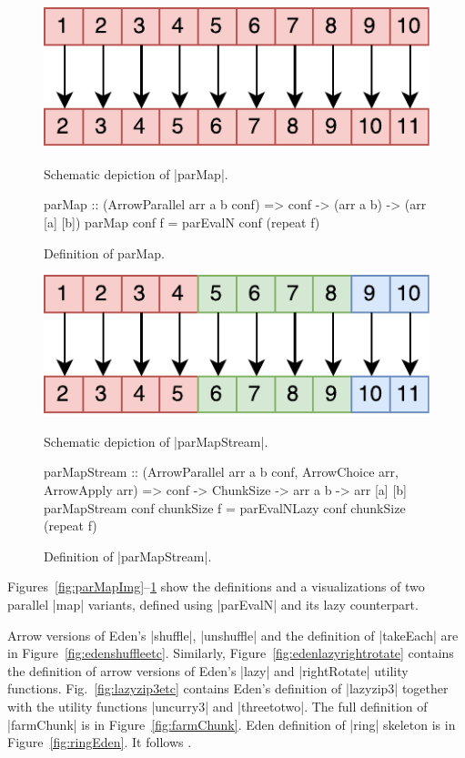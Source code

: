 \begin{figure}[thb]
\includegraphics[scale=0.7]{images/parMap}
\caption{Schematic depiction of |parMap|.}
\label{fig:parMapImg}

\begin{code}
parMap :: (ArrowParallel arr a b conf) => conf -> (arr a b) -> (arr [a] [b])
parMap conf f = parEvalN conf (repeat f)
\end{code}
\caption{Definition of parMap.}
\label{fig:parMap}

\includegraphics[scale=0.7]{images/parMapStream}
\caption{Schematic depiction of |parMapStream|.}
\label{fig:parMapStreamImg}

\begin{code}
parMapStream :: (ArrowParallel arr a b conf, ArrowChoice arr, ArrowApply arr) =>
	conf -> ChunkSize -> arr a b -> arr [a] [b]
parMapStream conf chunkSize f = parEvalNLazy conf chunkSize (repeat f)
\end{code}
\caption{Definition of |parMapStream|.}
\label{fig:parMapStream}
\end{figure}

Figures~\ref{fig:parMapImg}--\ref{fig:parMapStream} show the definitions and a visualizations of two parallel |map| variants, defined using |parEvalN| and its lazy counterpart.

Arrow versions of Eden's |shuffle|, |unshuffle| and the definition of |takeEach| are in Figure~\ref{fig:edenshuffleetc}. Similarly, Figure~\ref{fig:edenlazyrightrotate} contains the definition of arrow versions of Eden's |lazy| and |rightRotate| utility functions. Fig.~\ref{fig:lazyzip3etc} contains Eden's definition of |lazyzip3| together with the utility functions |uncurry3| and |threetotwo|.
The full definition of |farmChunk| is in Figure~\ref{fig:farmChunk}.
Eden definition of |ring| skeleton is in Figure~\ref{fig:ringEden}. It
follows \citet{Loogen2012}.


